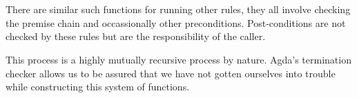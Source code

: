 \begin{code}
\>[6]\AgdaSpace{}%
%
\>[621I]\AgdaSpace{}%
\AgdaSpace{}%
\AgdaSpace{}%
\AgdaSpace{}%
\<%
\\
\>[621I][@{}l@{\AgdaIndent{0}}]%
\>[20]\AgdaSymbol{(}\AgdaSpace{}%
\AgdaSpace{}%
\AgdaSymbol{(}\AgdaSpace{}%
\AgdaSymbol{(}\AgdaSpace{}%
\AgdaSymbol{)))}\<%
\\
%
\>[6]\AgdaSpace{}%
\AgdaSymbol{(}\AgdaSpace{}%
\AgdaSpace{}%
\AgdaSymbol{(}\AgdaSpace{}%
\AgdaSymbol{))}\<%
\end{code}

There are similar such functions for running other rules, they all involve
checking the premise chain and occassionally other preconditions. Post-conditions
are not checked by these rules but are the responsibility of the caller.

This process is a highly mutually recursive process by nature. Agda's termination
checker allows us to be assured that we have not gotten ourselves into trouble
while constructing this system of functions.


